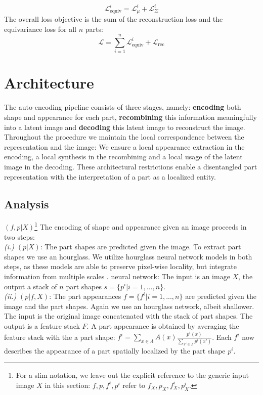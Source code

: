 	\begin{equation}
	\mathcal{L}_{\textrm{equiv}}^i = \mathcal{L}_{\mu}^i+ \mathcal{L}_{\Sigma}^i
	\label{covariance}
	\end{equation}
	The overall loss objective is the sum of the reconstruction loss and the equivariance loss for all $n$ parts:
	\begin{equation}
	\mathcal{L} = \sum_{i=1}^n \mathcal{L}_{\text{equiv}}^i + \mathcal{L}_{\textrm{rec}}
	\end{equation}


\section{Architecture}\label{sec:architecture}


	The auto-encoding pipeline consists of three stages, namely: \textbf{encoding} both shape and appearance for each part,  \textbf{recombining} this information meaningfully into a latent image and \textbf{decoding} this latent image to reconstruct the image. %
	Throughout the procedure we maintain the local correspondence between the representation and the image: We ensure a local appearance extraction in the encoding, a local synthesis in the recombining and a local usage of the latent image in the decoding. These architectural restrictions enable a disentangled part representation with the interpretation of a part as a localized entity. \\

	\subsection{Analysis}
		${(f, p | X)}$\footnote{ For a slim notation, we leave out the explicit reference to the generic input image $X$ in this section: $f, p, f^i, p^i$ refer to $f_X, p_X, f^i_X, p^i_X$.} The encoding of shape and appearance given an image proceeds in two steps: \\
		\emph{(i.)} $(p|X)$: The part shapes are predicted given the image. To extract part shapes we use an hourglass. We utilize hourglass neural network models in both steps, as these models are able to preserve pixel-wise locality, but integrate information from multiple scales \cite{newell16hourglass}.  neural network: The input is an image $X$, the output a stack of $n$ part shapes $s =  \{p^i| i=1, ...,  n\}$.\\ 
		\emph{(ii.)} $(p|f,X)$: The part appearances $f =  \{f^i| i=1, ...,  n\}$ are predicted given the image and the part shapes. Again we use an hourglass network, albeit shallower. The input is the original image concatenated with the stack of part shapes. The output is a feature stack $F$. A part appearance is obtained by averaging the feature stack with the a part shape: $f^i = \sum_{x \in \Lambda} A(x) \frac{p^i(x)}{\sum_{x' \in \Lambda}p^i(x')} $. Each $f^i$ now describes the appearance of a part spatially localized by the part shape $p^i$. \\


